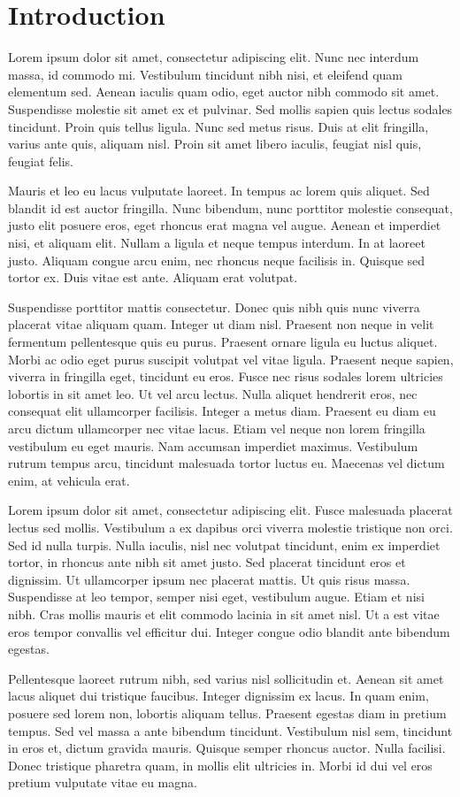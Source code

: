 \doublespacing
\section{Introduction}
\sloppy

Lorem ipsum dolor sit amet, consectetur adipiscing elit. Nunc nec interdum massa, id commodo mi. Vestibulum tincidunt nibh nisi, et eleifend quam elementum sed. Aenean iaculis quam odio, eget auctor nibh commodo sit amet. Suspendisse molestie sit amet ex et pulvinar. Sed mollis sapien quis lectus sodales tincidunt. Proin quis tellus ligula. Nunc sed metus risus. Duis at elit fringilla, varius ante quis, aliquam nisl. Proin sit amet libero iaculis, feugiat nisl quis, feugiat felis.

Mauris et leo eu lacus vulputate laoreet. In tempus ac lorem quis aliquet. Sed blandit id est auctor fringilla. Nunc bibendum, nunc porttitor molestie consequat, justo elit posuere eros, eget rhoncus erat magna vel augue. Aenean et imperdiet nisi, et aliquam elit. Nullam a ligula et neque tempus interdum. In at laoreet justo. Aliquam congue arcu enim, nec rhoncus neque facilisis in. Quisque sed tortor ex. Duis vitae est ante. Aliquam erat volutpat.

Suspendisse porttitor mattis consectetur. Donec quis nibh quis nunc viverra placerat vitae aliquam quam. Integer ut diam nisl. Praesent non neque in velit fermentum pellentesque quis eu purus. Praesent ornare ligula eu luctus aliquet. Morbi ac odio eget purus suscipit volutpat vel vitae ligula. Praesent neque sapien, viverra in fringilla eget, tincidunt eu eros. Fusce nec risus sodales lorem ultricies lobortis in sit amet leo. Ut vel arcu lectus. Nulla aliquet hendrerit eros, nec consequat elit ullamcorper facilisis. Integer a metus diam. Praesent eu diam eu arcu dictum ullamcorper nec vitae lacus. Etiam vel neque non lorem fringilla vestibulum eu eget mauris. Nam accumsan imperdiet maximus. Vestibulum rutrum tempus arcu, tincidunt malesuada tortor luctus eu. Maecenas vel dictum enim, at vehicula erat.

Lorem ipsum dolor sit amet, consectetur adipiscing elit. Fusce malesuada placerat lectus sed mollis. Vestibulum a ex dapibus orci viverra molestie tristique non orci. Sed id nulla turpis. Nulla iaculis, nisl nec volutpat tincidunt, enim ex imperdiet tortor, in rhoncus ante nibh sit amet justo. Sed placerat tincidunt eros et dignissim. Ut ullamcorper ipsum nec placerat mattis. Ut quis risus massa. Suspendisse at leo tempor, semper nisi eget, vestibulum augue. Etiam et nisi nibh. Cras mollis mauris et elit commodo lacinia in sit amet nisl. Ut a est vitae eros tempor convallis vel efficitur dui. Integer congue odio blandit ante bibendum egestas.

Pellentesque laoreet rutrum nibh, sed varius nisl sollicitudin et. Aenean sit amet lacus aliquet dui tristique faucibus. Integer dignissim ex lacus. In quam enim, posuere sed lorem non, lobortis aliquam tellus. Praesent egestas diam in pretium tempus. Sed vel massa a ante bibendum tincidunt. Vestibulum nisl sem, tincidunt in eros et, dictum gravida mauris. Quisque semper rhoncus auctor. Nulla facilisi. Donec tristique pharetra quam, in mollis elit ultricies in. Morbi id dui vel eros pretium vulputate vitae eu magna.

\fussy
